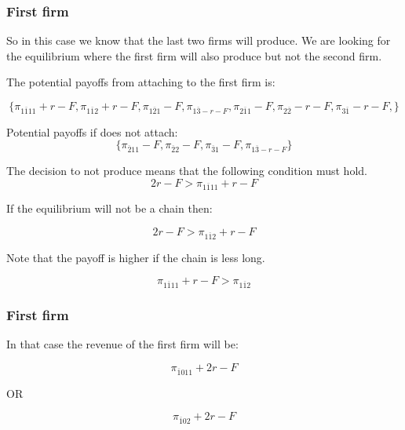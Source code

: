 \documentclass{article}
\begin{document}
\subsubsection{First firm}

So in this case we know that the last two firms will produce. We are looking for the equilibrium where the first firm will also produce but not the second firm. 

The potential payoffs from attaching to the first firm is:

\begin{equation*}
\{ 
\pi_{1 \overline{1}11}+r-F,
\pi_{1 \overline{1}2} + r -F ,
\pi_{1 \overline{2}1} - F , 
\pi_{1 \overline{3} -r -F },
\pi_{2 \overline{1}1} -F ,
\pi_{2 \overline{2}} -r - F, 
\pi_{3 \overline{1}} -r -F, \}
\end{equation*}

Potential payoffs if does not attach:
\begin{equation*}
\{ 
\pi_{ \overline{2}11}-F,
\pi_{\overline{2}2} -F ,
\pi_{ \overline{3}1} - F , 
\pi_{1 \overline{3} -r -F }
\}
\end{equation*}

The decision to not produce means that the following condition must hold. 
\begin{equation*}
2r-F>\pi_{1\overline{1}11}+r-F
\end{equation*}

If the equilibrium will not be a chain then:

\begin{equation*}
2r-F>\pi_{1\overline{1}2}+r-F
\end{equation*}

Note that the payoff is higher if the chain is less long. 

\begin{equation*}
\pi_{1\overline{1}11}+r- F> \pi_{1\overline{1}2}
\end{equation*}

\subsubsection{First firm}

In that case the revenue of the first firm will be:

\begin{equation*}
\pi_{\overline{1}011}+2r-F
\end{equation*}

OR

\begin{equation*}
\pi_{\overline{1}02}+2r-F
\end{equation*}
\end{document}
